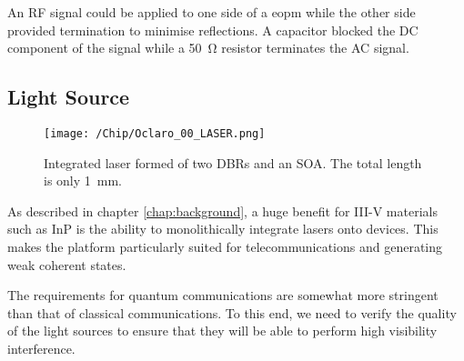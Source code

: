 An RF signal could be applied to one side of a \ac{eopm} while the other side provided termination to minimise reflections. A capacitor blocked the DC component of the signal while a \SI{50}{\ohm} resistor terminates the AC signal. 

\subsection{Light Source}

\begin{figure}[tp]
	\centering
	\texttt{[image: /Chip/Oclaro\_00\_LASER.png]}
	\caption[Microscope image of the on-chip laser]{Integrated laser formed of two DBRs and an SOA. The total length is only \SI{1}{\mm}.}
	\label{fig:InP_laser}
\end{figure}

As described in chapter \ref{chap:background}, a huge benefit for III-V materials such as \ac{InP} is the ability to monolithically integrate lasers onto devices. This makes the platform particularly suited for telecommunications and generating weak coherent states. 

The requirements for quantum communications are somewhat more stringent than that of classical communications. To this end, we need to verify the quality of the light sources to ensure that they will be able to perform high visibility interference. 

